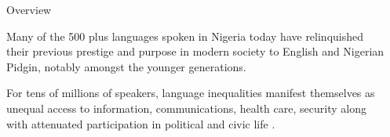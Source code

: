 \documentclass[final]{beamer}
\newlength{\sepwid}
\newlength{\onecolwid}
\begin{document}
\begin{frame}[t] %

\begin{columns}[t] %

\begin{column}{\sepwid}\end{column} %

\begin{column}{\onecolwid} %


\begin{block}{Overview}

Many of the 500 plus languages spoken in Nigeria today have relinquished their previous prestige and purpose in modern society to English and Nigerian Pidgin, notably amongst the younger generations.

\vspace{10mm}

For tens of millions of speakers, language inequalities manifest themselves as unequal access to information, communications, health care, security along with attenuated participation in political and civic life \cite{odojelanguage, awobuluyi201626}.

\end{block}

\vspace{5mm}

\begin{block}{}

\vspace{-15mm}


\end{block}
\end{column}
\end{columns}
\end{frame}
\end{document}
